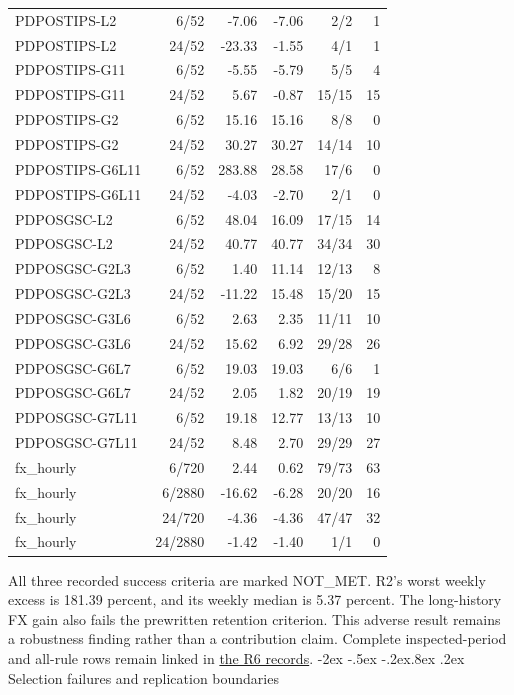\documentclass[10pt,a4paper]{article}
\makeatletter
\renewcommand\section{\@startsection{section}{1}{\z@}%
  {-2ex \@plus -.5ex \@minus -.2ex}{.8ex \@plus .2ex}%
  {\normalfont\large\bfseries}}
\makeatother
\begin{document}
\begin{longtable}{p{35mm}rrrrr}
PDPOSTIPS-L2 & 6/52 & -7.06 & -7.06 & 2/2 & 1 \\
PDPOSTIPS-L2 & 24/52 & -23.33 & -1.55 & 4/1 & 1 \\
PDPOSTIPS-G11 & 6/52 & -5.55 & -5.79 & 5/5 & 4 \\
PDPOSTIPS-G11 & 24/52 & 5.67 & -0.87 & 15/15 & 15 \\
PDPOSTIPS-G2 & 6/52 & 15.16 & 15.16 & 8/8 & 0 \\
PDPOSTIPS-G2 & 24/52 & 30.27 & 30.27 & 14/14 & 10 \\
PDPOSTIPS-G6L11 & 6/52 & 283.88 & 28.58 & 17/6 & 0 \\
PDPOSTIPS-G6L11 & 24/52 & -4.03 & -2.70 & 2/1 & 0 \\
PDPOSGSC-L2 & 6/52 & 48.04 & 16.09 & 17/15 & 14 \\
PDPOSGSC-L2 & 24/52 & 40.77 & 40.77 & 34/34 & 30 \\
PDPOSGSC-G2L3 & 6/52 & 1.40 & 11.14 & 12/13 & 8 \\
PDPOSGSC-G2L3 & 24/52 & -11.22 & 15.48 & 15/20 & 15 \\
PDPOSGSC-G3L6 & 6/52 & 2.63 & 2.35 & 11/11 & 10 \\
PDPOSGSC-G3L6 & 24/52 & 15.62 & 6.92 & 29/28 & 26 \\
PDPOSGSC-G6L7 & 6/52 & 19.03 & 19.03 & 6/6 & 1 \\
PDPOSGSC-G6L7 & 24/52 & 2.05 & 1.82 & 20/19 & 19 \\
PDPOSGSC-G7L11 & 6/52 & 19.18 & 12.77 & 13/13 & 10 \\
PDPOSGSC-G7L11 & 24/52 & 8.48 & 2.70 & 29/29 & 27 \\
fx\_hourly & 6/720 & 2.44 & 0.62 & 79/73 & 63 \\
fx\_hourly & 6/2880 & -16.62 & -6.28 & 20/20 & 16 \\
fx\_hourly & 24/720 & -4.36 & -4.36 & 47/47 & 32 \\
fx\_hourly & 24/2880 & -1.42 & -1.40 & 1/1 & 0 \\
\end{longtable}
\endgroup

All three recorded success criteria are marked NOT\_MET.
R2's worst weekly excess is 181.39 percent,
and its weekly median is 5.37 percent.
The long-history FX gain also fails the prewritten retention criterion.
This adverse result remains a robustness finding rather than a contribution
claim. Complete inspected-period and all-rule rows remain linked in
\href{https://github.com/ByronLi0207/financial-mathematics-paper-20261020/blob/revision-v7-final/results/supervisor-20261023/r6/README.md}{the R6 records}.\section{Selection failures and replication boundaries}\label{sup:selection-failures}
\end{document}
